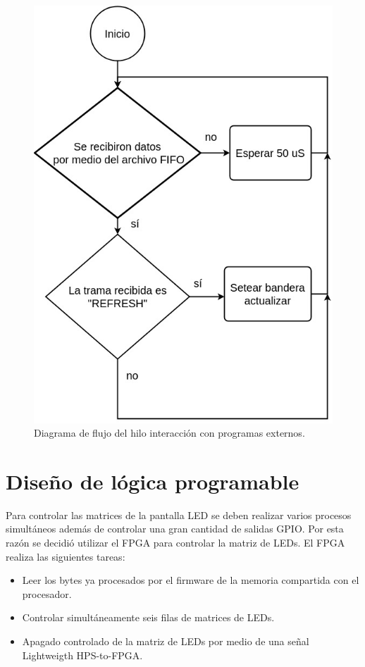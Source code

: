 \begin{figure}[htpb]
	\centering
	\includegraphics[scale=0.7]{Figures/hilo3.jpg} 
	\caption{Diagrama de flujo del hilo interacción con programas externos.}
	\label{fig: hilofifo}
\end{figure}
\pagebreak

\section{ Diseño de lógica programable}
Para controlar las matrices de la pantalla LED se deben realizar varios procesos simultáneos además de controlar una gran cantidad de salidas GPIO. Por esta razón se decidió utilizar el FPGA para controlar la matriz de LEDs.
El FPGA realiza las siguientes tareas:
\begin{itemize}
\item Leer los bytes ya procesados por el firmware de la memoria compartida con el procesador. 
\item Controlar simultáneamente seis filas de matrices de LEDs.
\item Apagado controlado de la matriz de LEDs por medio de una señal Lightweigth HPS-to-FPGA.
\end{itemize}

